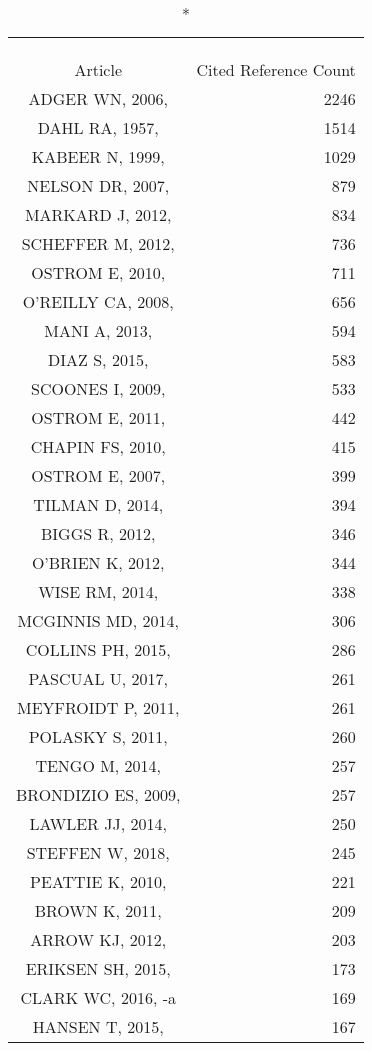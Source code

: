 \documentclass[]{article}
\begin{document}
\begin{longtable}{cr}
\caption*{
\large Citations' Most Frequently Cited References\textsuperscript{1}\\ 
\small \textsuperscript{}\\ 
} \\ 
\toprule
Article & Cited Reference Count \\ 
\midrule
ADGER WN, 2006,  & 2246 \\ 
DAHL RA, 1957,  & 1514 \\ 
KABEER N, 1999,  & 1029 \\ 
NELSON DR, 2007,  & 879 \\ 
MARKARD J, 2012,  & 834 \\ 
SCHEFFER M, 2012,  & 736 \\ 
OSTROM E, 2010,  & 711 \\ 
O'REILLY CA, 2008,  & 656 \\ 
MANI A, 2013,  & 594 \\ 
DIAZ S, 2015,  & 583 \\ 
SCOONES I, 2009,  & 533 \\ 
OSTROM E, 2011,  & 442 \\ 
CHAPIN FS, 2010,  & 415 \\ 
OSTROM E, 2007,  & 399 \\ 
TILMAN D, 2014,  & 394 \\ 
BIGGS R, 2012,  & 346 \\ 
O'BRIEN K, 2012,  & 344 \\ 
WISE RM, 2014,  & 338 \\ 
MCGINNIS MD, 2014,  & 306 \\ 
COLLINS PH, 2015,  & 286 \\ 
PASCUAL U, 2017,  & 261 \\ 
MEYFROIDT P, 2011,  & 261 \\ 
POLASKY S, 2011,  & 260 \\ 
TENGO M, 2014,  & 257 \\ 
BRONDIZIO ES, 2009,  & 257 \\ 
LAWLER JJ, 2014,  & 250 \\ 
STEFFEN W, 2018,  & 245 \\ 
PEATTIE K, 2010,  & 221 \\ 
BROWN K, 2011,  & 209 \\ 
ARROW KJ, 2012,  & 203 \\ 
ERIKSEN SH, 2015,  & 173 \\ 
CLARK WC, 2016, -a & 169 \\ 
HANSEN T, 2015,  & 167 \\ 

\end{longtable}
\end{document}
